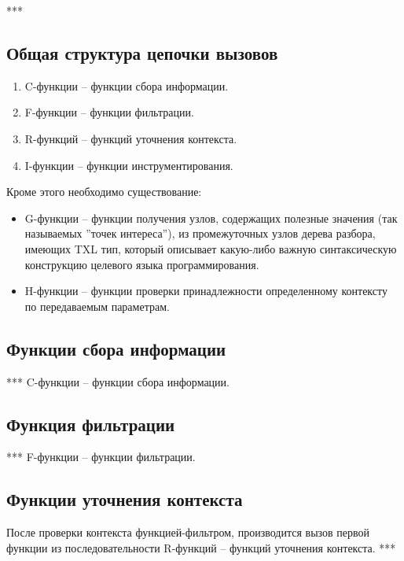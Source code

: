 ***

\subsection{Общая структура цепочки вызовов}

\begin{enumerate}
  \item C-функции -- функции сбора информации.
  \item F-функции -- функции фильтрации.
  \item R-функций -- функций уточнения контекста.
  \item I-функции -- функции инструментирования.
\end{enumerate}

Кроме этого необходимо существование:
\begin{itemize}
  \item G-функции -- функции получения узлов, содержащих полезные значения (так называемых ''точек интереса''), из промежуточных узлов дерева разбора, имеющих TXL тип, который описывает какую-либо важную синтаксическую конструкцию целевого языка программирования.
  \item H-функции -- функции проверки принадлежности определенному контексту по передаваемым параметрам.
\end{itemize}

\subsection{Функции сбора информации}

***
C-функции -- функции сбора информации.

\subsection{Функция фильтрации}

***
F-функции -- функции фильтрации.

\subsection{Функции уточнения контекста}

После проверки контекста функцией-фильтром, производится вызов первой функции из последовательности R-функций -- функций уточнения контекста.
***

